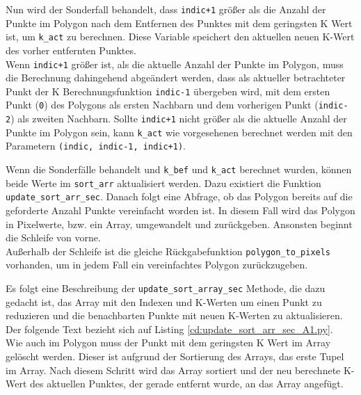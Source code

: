 {	Nun wird der Sonderfall behandelt, dass \lstinline|indic+1| größer als die Anzahl der Punkte im Polygon nach dem Entfernen des Punktes mit dem geringsten K Wert ist, um \lstinline|k_act| zu berechnen. Diese Variable speichert den aktuellen neuen K-Wert des vorher entfernten Punktes. \\
	Wenn \lstinline|indic+1| größer ist, als die aktuelle Anzahl der Punkte im Polygon, muss die Berechnung dahingehend abgeändert werden, dass als aktueller betrachteter Punkt der K Berechnungsfunktion \lstinline|indic-1| übergeben wird, mit dem ersten Punkt (\lstinline|0|) des Polygons als ersten Nachbarn und dem vorherigen Punkt (\lstinline|indic-2|) als zweiten Nachbarn. Sollte \lstinline|indic+1| nicht größer als die aktuelle Anzahl der Punkte im Polygon sein, kann \lstinline|k_act| wie vorgesehenen berechnet werden mit den Parametern \lstinline|(indic, indic-1, indic+1)|.

	\ifimportant
	
	\fi

	Wenn die Sonderfälle behandelt und \lstinline|k_bef| und \lstinline|k_act| berechnet wurden, können beide Werte im \lstinline|sort_arr| aktualisiert werden. Dazu existiert die Funktion \lstinline|update_sort_arr_sec|. Danach folgt eine Abfrage, ob das Polygon bereits auf die geforderte Anzahl Punkte vereinfacht worden ist. In diesem Fall wird das Polygon in Pixelwerte, bzw. ein Array, umgewandelt und zurückgeben. Ansonsten beginnt die Schleife von vorne. \\
	Außerhalb der Schleife ist die gleiche Rückgabefunktion \lstinline|polygon_to_pixels| vorhanden, um in jedem Fall ein vereinfachtes Polygon zurückzugeben.

	\ifimportant
	
	

	
	\fi

	Es folgt eine Beschreibung der \lstinline|update_sort_array_sec| Methode, die dazu gedacht ist, das Array mit den Indexen und K-Werten um einen Punkt zu reduzieren und die benachbarten Punkte mit neuen K-Werten zu aktualisieren. \ifimportant Der folgende Text bezieht sich auf Listing \ref{cd:update_sort_arr_sec_A1.py}. \fi \\
	Wie auch im Polygon muss der Punkt mit dem geringsten K Wert im Array gelöscht werden. Dieser ist aufgrund der Sortierung des Arrays, das erste Tupel im Array. Nach diesem Schritt wird das Array sortiert und der neu berechnete K-Wert des aktuellen Punktes, der gerade entfernt wurde, an das Array angefügt. \\

}
